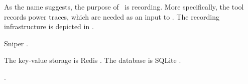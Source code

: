 
As the name suggests, the purpose of \recorder\ is recording. More specifically,
the tool records power traces, which are needed as an input to \streamer. The
recording infrastructure is depicted in .

Sniper \cite{carlson2011}.


The key-value storage is Redis \cite{redis}. The database is SQLite
\cite{sqlite}.

 \cite{li2009}.
